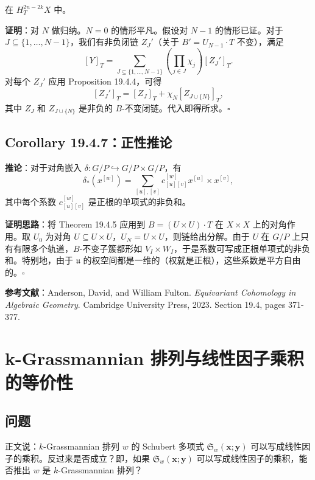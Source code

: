 在 $H_T^{2n-2k}X$ 中。

\textbf{证明}：对 $N$ 做归纳。$N=0$ 的情形平凡。假设对 $N-1$ 的情形已证。对于 $J \subseteq \{1,\ldots,N-1\}$，我们有非负闭链 $Z_J'$（关于 $B' = U_{N-1} \cdot T$ 不变），满足
\[[Y]_T = \sum_{J \subseteq \{1,\ldots,N-1\}} \left(\prod_{j \in J} \chi_j\right) [Z_J']_T.\]
对每个 $Z_J'$ 应用 Proposition 19.4.4，可得
\[[Z_J']_T = [Z_J]_T + \chi_N [Z_{J \cup \{N\}}]_T,\]
其中 $Z_J$ 和 $Z_{J \cup \{N\}}$ 是非负的 $B$-不变闭链。代入即得所求。$\square$

\subsection{Corollary 19.4.7：正性推论}

\textbf{推论}：对于对角嵌入 $\delta: G/P \hookrightarrow G/P \times G/P$，有
\[\delta_*(x^{[w]}) = \sum_{[u],[v]} c_{[u][v]}^{[w]} x^{[u]} \times x^{[v]},\]
其中每个系数 $c_{[u][v]}^{[w]}$ 是正根的单项式的非负和。

\textbf{证明思路}：将 Theorem 19.4.5 应用到 $B = (U \times U) \cdot T$ 在 $X \times X$ 上的对角作用。取 $U_0$ 为对角 $U \subseteq U \times U$，$U_N = U \times U$，则链给出分解。由于 $U$ 在 $G/P$ 上只有有限多个轨道，$B$-不变子簇都形如 $V_I \times W_I$，于是系数可写成正根单项式的非负和。特别地，由于 $\mathfrak{u}$ 的权空间都是一维的（权就是正根），这些系数是平方自由的。$\square$

\textbf{参考文献}：Anderson, David, and William Fulton. \emph{Equivariant Cohomology in Algebraic Geometry}. Cambridge University Press, 2023. Section 19.4, pages 371-377.
\section{k-Grassmannian 排列与线性因子乘积的等价性}\label{sec:GrassmannianLinearFactor}
\subsection{问题}
正文说：$k$-Grassmannian 排列 $w$ 的 Schubert 多项式 $\mathfrak{S}_w(\mathbf{x}; \mathbf{y})$ 可以写成线性因子的乘积。反过来是否成立？即，如果 $\mathfrak{S}_w(\mathbf{x}; \mathbf{y})$ 可以写成线性因子的乘积，能否推出 $w$ 是 $k$-Grassmannian 排列？
